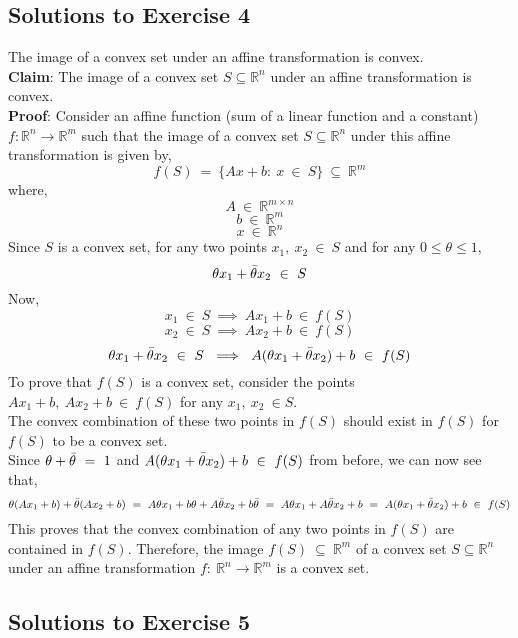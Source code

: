 \documentclass[12pt, draftcls, onecolumn]{IEEEtran}
\begin{document}
\subsection{Solutions to Exercise 4}
The image of a convex set under an affine transformation is convex.
\\\textbf{Claim}: The image of a convex set $S \subseteq \mathbb{R}^n$ under an affine transformation is convex.
\\\textbf{Proof}: Consider an affine function (sum of a linear function and a constant) $f: \mathbb{R}^n \rightarrow \mathbb{R}^m$ such that the image of a convex set $S \subseteq \mathbb{R}^n$ under this affine transformation is given by,
\[f(S)\ =\ \{Ax+b:\ x\ \in\ S\}\ \subseteq\ \mathbb{R}^m\]
where,
\[A\ \in\ \mathbb{R}^{m \times n}\]
\[b\ \in\ \mathbb{R}^m\]
\[x\ \in\ \mathbb{R}^n\]
Since $S$ is a convex set, for any two points $x_1,\ x_2\ \in\ S$ and for any $0 \leq \theta \leq 1$,
\[\theta x_1 + \Bar{\theta} x_2\ \in\ S\]
Now,
\[x_1\ \in\ S\ \implies\ Ax_1+b\ \in\ f(S)\]
\[x_2\ \in\ S\ \implies\ Ax_2+b\ \in\ f(S)\]
\[\theta x_1 + \Bar{\theta} x_2\ \in\ S\ \implies\ A(\theta x_1 + \Bar{\theta} x_2)+b\ \in\ f(S)\]
To prove that $f(S)$ is a convex set, consider the points $Ax_1+b,\ Ax_2+b\ \in\ f(S)$ for any $x_1,\ x_2\ \in S$.
\\The convex combination of these two points in $f(S)$ should exist in $f(S)$ for $f(S)$ to be a convex set.
\\Since $\theta + \Bar{\theta}\ =\ 1$ and $A(\theta x_1 + \Bar{\theta}x_2)+b\ \in\ f(S)$ from before, we can now see that,
\[\theta(Ax_1+b)+\Bar{\theta}(Ax_2+b)\ =\ A\theta x_1 + b\theta + A\Bar{\theta} x_2 + b\Bar{\theta}\ =\ A\theta x_1 + A\Bar{\theta} x_2 + b\ =\ A(\theta x_1 + \Bar{\theta}x_2)+b\ \in\ f(S)\]
This proves that the convex combination of any two points in $f(S)$ are contained in $f(S)$.
Therefore, the image $f(S)\ \subseteq\ \mathbb{R}^m$ of a convex set $S \subseteq \mathbb{R}^n$ under an affine transformation $f:\ \mathbb{R}^n \rightarrow \mathbb{R}^m$ is a convex set.
\subsection{Solutions to Exercise 5}
\end{document}
